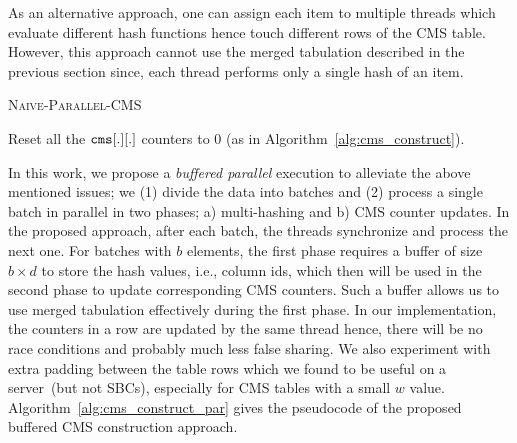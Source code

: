 \documentclass[10pt, review=true,sigconf]{acmart}
\begin{document}
As an alternative approach, one can assign each item to multiple threads which evaluate different hash functions hence touch different rows of the CMS table. However, this approach cannot use the merged tabulation described in the previous section since, each thread performs only a single hash of an item. 


 \begin{algorithm}[htbp]
  	\small
  	\caption{\textsc{Naive-Parallel-CMS}} 
  	\SetAlgoNoLine
		Reset all the ${\tt cms}[.][.]$ counters to 0 (as in Algorithm~\ref{alg:cms_construct}).
		
	\label{alg:cms_construct_par_nobuf}
\end{algorithm} 	

In this work, we propose a {\em buffered parallel} execution to alleviate the above mentioned issues; we (1) divide the data into batches and (2) process a single batch in parallel in two phases; a) multi-hashing and b) CMS counter updates. In the proposed approach, after each batch, the threads synchronize and process the next one. For batches with $b$ elements, the first phase requires a buffer of size $b \times d$ to store the hash values, i.e., column ids, which then will be used in the second phase to update corresponding CMS counters. Such a buffer allows us to use merged tabulation effectively during the first phase. In our implementation, the counters in a row are updated by the same thread hence, there will be no race conditions and probably much less false sharing. We also experiment with extra padding between the table rows which we found to be useful on a server~(but not SBCs), especially for CMS tables with a small $w$ value. Algorithm~\ref{alg:cms_construct_par} gives the pseudocode of the proposed buffered CMS construction approach. 
\end{document}
